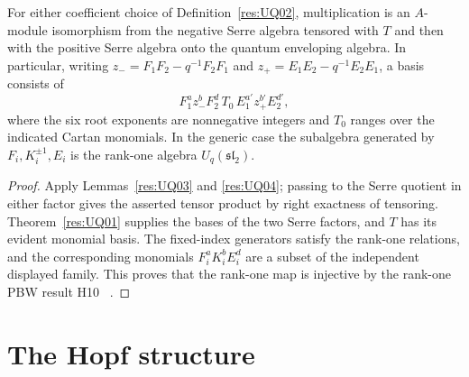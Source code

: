 \begin{theorem}
\label{res:UQ05}
For either coefficient choice of Definition~\ref{res:UQ02},
multiplication is an \(A\)-module isomorphism from
the negative Serre algebra tensored with \(T\) and then
with the positive Serre algebra onto the quantum
enveloping algebra. In particular, writing
\(z_-=F_1F_2-q^{-1}F_2F_1\) and
\(z_+=E_1E_2-q^{-1}E_2E_1\), a basis consists of
\[
 F_1^a z_-^b F_2^d\, T_0\, E_1^{a'} z_+^{b'} E_2^{d'},
\]
where the six root exponents are nonnegative integers and
\(T_0\) ranges over the indicated Cartan monomials.
In the generic case the subalgebra generated by
\(F_i,K_i^{\pm1},E_i\) is the rank-one algebra
\(U_q(\mathfrak{sl}_2)\).
\end{theorem}
\begin{proof}
Apply Lemmas~\ref{res:UQ03} and \ref{res:UQ04};
passing to the Serre quotient in either factor gives
the asserted tensor product by right exactness of
tensoring. Theorem~\ref{res:UQ01} supplies the bases
of the two Serre factors, and \(T\) has its evident
monomial basis. The fixed-index generators satisfy the
rank-one relations, and the corresponding monomials
\(F_i^aK_i^bE_i^d\) are a subset of the independent
displayed family. This proves that the rank-one map is
injective by the rank-one PBW result H10
~\cite[PDF p.~25]{mg-rm03d}.
\end{proof}

\section{The Hopf structure}

